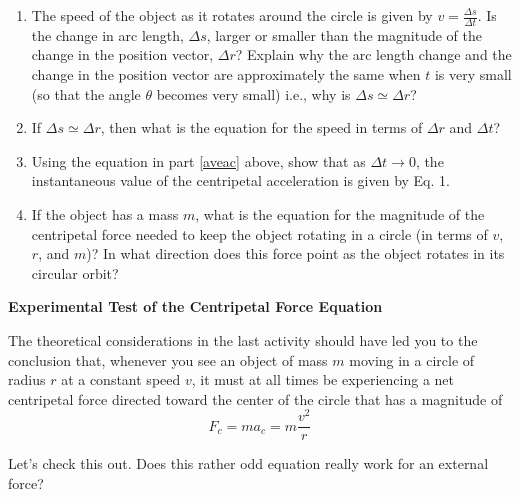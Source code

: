 \begin{enumerate}
\item The speed of the object as it rotates around the circle is given by \( v=\frac{\Delta s}{\Delta t} \).
Is the change in arc length, \( \Delta s \), larger or smaller than the magnitude
of the change in the position vector, \( \Delta r \)? Explain why the arc length
change and the change in the position vector are approximately the same when
$t$ is very small (so that the angle $\theta$ becomes very small) i.e., why is
\( \Delta  s
 \simeq   \Delta  r\)?
\vspace{20mm}

\item If \( \Delta s  \simeq   \Delta  r\), then what is the equation
for the speed in terms of \( \Delta  r\) and \( \Delta  t\)?
\vspace{20mm}

\item Using the equation in part \ref{aveac} above, show that as \( \Delta t  \rightarrow 0 \),
the instantaneous value of the centripetal acceleration is given by Eq. 1.
\vspace{20mm}

\item If the object has a mass $m$, what is the equation for the magnitude of the
centripetal force needed to keep the object rotating in a circle (in terms of
$v$, $r$, and $m$)? In what direction does this force point as the object rotates
in its circular orbit?
\vspace{20mm}

\end{enumerate}

\textbf{Experimental Test of the Centripetal Force Equation }

The theoretical considerations in the last activity should have led you to the
conclusion that, whenever you see an object of mass $m$ moving in a circle of
radius $r$ at a constant speed $v$, it must at all times be experiencing a net centripetal
force directed toward the center of the circle that has a magnitude of
\begin{equation}
F_{c}=ma_{c}=m\frac{v^{2}}{r}\label{eq:Fcent}
\end{equation}

Let's check this out. Does this rather odd equation really work for an external
force?

